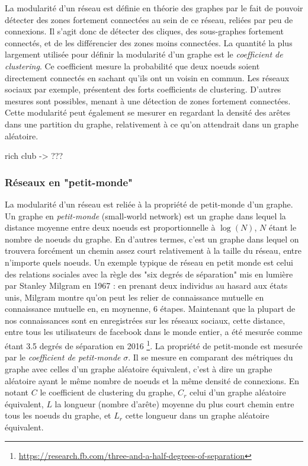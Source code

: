 La modularité d'un réseau est définie en théorie des graphes par le fait de pouvoir détecter des zones fortement connectées au sein de ce réseau, reliées par peu de connexions. Il s'agit donc de détecter des cliques, des sous-graphes fortement connectés, et de les différencier des zones moins connectées. 
La quantité la plus largement utilisée pour définir la	modularité d'un graphe est le \emph{coefficient de clustering}. Ce coefficient mesure la probabilité que deux noeuds soient directement connectés en sachant qu'ils ont un voisin en commun. Les réseaux sociaux par exemple, présentent des forts coefficients de clustering. D'autres mesures sont possibles, menant à une détection de zones fortement connectées. Cette modularité peut également se mesurer en regardant la densité des arêtes dans une partition du graphe, relativement à ce qu'on attendrait dans un graphe aléatoire. 

rich club -> ???


\subsubsection{Réseaux en "petit-monde"}

La modularité d'un réseau est reliée à la propriété de petit-monde d'un graphe. 
Un graphe en \emph{petit-monde} (small-world network) est un graphe dans lequel la distance moyenne entre deux noeuds est proportionnelle à $\log(N)$, $N$ étant le nombre de noeuds du graphe. En d'autres termes, c'est un graphe dans lequel on trouvera forcément un chemin assez court relativement à la taille du réseau, entre n'importe quels noeuds. Un exemple typique de réseau en petit monde est celui des relations sociales avec la règle des "six degrés de séparation" mis en lumière par Stanley Milgram en 1967 \cite{Milgram1967TheSW} : en prenant deux individus au hasard aux états unis, Milgram montre qu'on peut les relier de connaissance mutuelle en connaissance mutuelle en, en moynenne, 6 étapes. Maintenant que la plupart de nos connaissances sont en enregistrées sur les réseaux sociaux, cette distance, entre tous les utilisateurs de facebook dans le monde entier, a été mesurée comme étant 3.5 degrés de séparation en 2016 \footnote{\url{https://research.fb.com/three-and-a-half-degrees-of-separation}}. La propriété de petit-monde est mesurée par le \emph{coefficient de petit-monde} $\sigma$. Il se mesure en comparant des métriques du graphe avec celles d'un graphe aléatoire équivalent, c'est à dire un graphe aléatoire ayant le même nombre de noeuds et la même densité de connexions. 
En notant $C$ le coefficient de clustering du graphe, $C_r$ celui d'un graphe aléatoire équivalent, $L$ la longueur (nombre d'arête) moyenne du plus court chemin entre tous les noeuds du graphe, et $L_r$ cette longueur dans un graphe aléatoire équivalent. 

